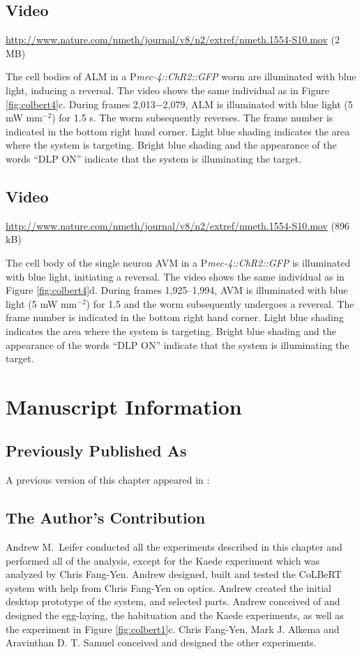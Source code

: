 \subsection{Video}\label{movie:colbert8} %
\url{http://www.nature.com/nmeth/journal/v8/n2/extref/nmeth.1554-S10.mov} (2 MB)

The cell bodies of ALM in a P\textit{mec-4::ChR2::GFP} worm are illuminated with blue light, inducing a reversal. The video shows the same individual as in Figure \ref{fig:colbert4}c. During frames 2,013−2,079, ALM is illuminated with blue light (5 mW mm$^{−2}$) for 1.5 s. The worm subsequently reverses. The frame number is indicated in the bottom right hand corner. Light blue shading indicates the area where the system is targeting. Bright blue shading and the appearance of the words “DLP ON” indicate that the system is illuminating the target.

\subsection{Video}\label{movie:colbert9} %
\url{http://www.nature.com/nmeth/journal/v8/n2/extref/nmeth.1554-S10.mov} (896 kB)

The cell body of the single neuron AVM in a P\textit{mec-4::ChR2::GFP} is illuminated with blue light, initiating a reversal. The video shows the same individual as in Figure \ref{fig:colbert4}d. During frames 1,925–1,994, AVM is illuminated with blue light (5 mW mm$^{−2}$) for 1.5 and the worm subsequently undergoes a reversal. The frame number is indicated in the bottom right hand corner. Light blue shading indicates the area where the system is targeting. Bright blue shading and the appearance of the words “DLP ON” indicate that the system is illuminating the target.


\section{Manuscript Information}
\subsection{Previously Published As}
A previous version of this chapter appeared in \citep{leifer_optogenetic_2011}:


\subsection{The Author's Contribution}
Andrew M.~Leifer conducted all the experiments described in this chapter and performed all of the analysis, except for the Kaede experiment which was analyzed by Chris Fang-Yen. Andrew designed, built and tested the CoLBeRT system with help from Chris Fang-Yen on optics.  Andrew created the initial desktop prototype of the system, and selected		 parts.  Andrew conceived of and designed the egg-laying, the habituation and the Kaede experiments, as well as the experiment in Figure \ref{fig:colbert1}c.    Chris Fang-Yen, Mark J. Alkema and Aravinthan D. T. Samuel conceived and designed the other experiments. 

